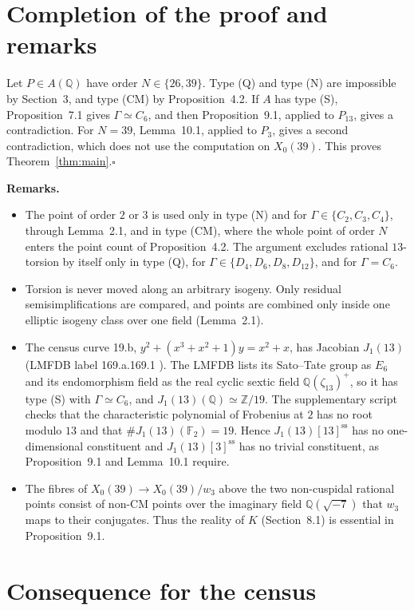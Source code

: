 \documentclass[11pt]{article}
\newcommand{\Q}{\mathbb Q}
\newcommand{\Z}{\mathbb Z}
\newcommand{\F}{\mathbb F}
\begin{document}
\section{Completion of the proof and remarks}

Let \(P\in A(\Q)\) have order \(N\in\{26,39\}\). Type (Q) and type
(N) are impossible by Section~3, and type (CM) by Proposition~4.2. If
\(A\) has type (S), Proposition~7.1 gives \(\Gamma\simeq C_6\), and
then Proposition~9.1, applied to \(P_{13}\), gives a contradiction. For
\(N=39\), Lemma~10.1, applied to \(P_3\), gives a second
contradiction, which does not use the computation on \(X_0(39)\). This
proves Theorem~\ref{thm:main}.\hfill\(\square\)

\medskip\noindent\textbf{Remarks.}
\begin{itemize}
\item The point of order \(2\) or \(3\) is used only in type (N) and
for \(\Gamma\in\{C_2,C_3,C_4\}\), through Lemma~2.1, and in type (CM),
where the whole point of order \(N\) enters the point count of
Proposition~4.2. The argument
excludes rational \(13\)-torsion by itself only in type (Q), for
\(\Gamma\in\{D_4,D_6,D_8,D_{12}\}\), and for \(\Gamma=C_6\).
\item Torsion is never moved along an arbitrary isogeny. Only residual
semisimplifications are compared, and points are combined only inside
one elliptic isogeny class over one field (Lemma~2.1).
\item The census curve 19.b, \(y^2+(x^3+x^2+1)y=x^2+x\), has Jacobian
\(J_1(13)\) (LMFDB label 169.a.169.1 \cite{LMFDB}). The LMFDB lists its
Sato--Tate group as \(E_6\) and its endomorphism field as the real
cyclic sextic field \(\Q(\zeta_{13})^+\), so it has type (S) with
\(\Gamma\simeq C_6\), and \(J_1(13)(\Q)\simeq\Z/19\). The supplementary
script checks that the characteristic polynomial of Frobenius at \(2\)
has no root modulo \(13\) and that \(\#J_1(13)(\F_2)=19\). Hence
\(J_1(13)[13]^{\mathrm{ss}}\) has no one-dimensional constituent and
\(J_1(13)[3]^{\mathrm{ss}}\) has no trivial constituent, as
Proposition~9.1 and Lemma~10.1 require.
\item The fibres of \(X_0(39)\to X_0(39)/w_3\) above the two
non-cuspidal rational points consist of non-CM points over the
imaginary field \(\Q(\sqrt{-7})\) that \(w_3\) maps to their
conjugates. Thus the reality of \(K\) (Section~8.1) is essential in
Proposition~9.1.
\end{itemize}

\section{Consequence for the census}
\end{document}
